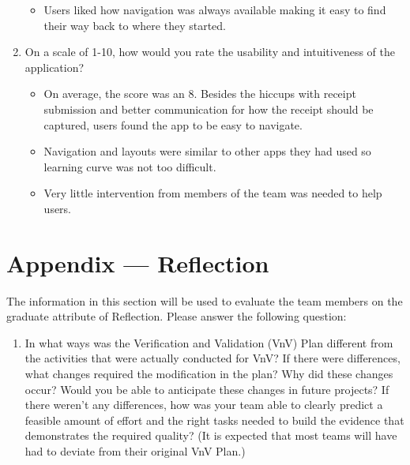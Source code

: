 \documentclass[12pt, titlepage]{article}
\begin{document}
\begin{enumerate}
\begin{itemize}
      \item Users liked how navigation was always available making it easy to find their way back to where
      they started.
    \end{itemize}
  \item On a scale of 1-10, how would you rate the usability and intuitiveness of the application?
    \begin{itemize}
      \item On average, the score was an 8. Besides the hiccups with receipt submission and better communication
      for how the receipt should be captured, users found the app to be easy to navigate.
      \item Navigation and layouts were similar to other apps they had used so learning curve was not
      too difficult.
      \item Very little intervention from members of the team was needed to help users.
    \end{itemize}
\end{enumerate}

\newpage{}
\section*{Appendix --- Reflection}

The information in this section will be used to evaluate the team members on the
graduate attribute of Reflection.  Please answer the following question:

\begin{enumerate}
  \item In what ways was the Verification and Validation (VnV) Plan different
  from the activities that were actually conducted for VnV?  If there were
  differences, what changes required the modification in the plan?  Why did
  these changes occur?  Would you be able to anticipate these changes in future
  projects?  If there weren't any differences, how was your team able to clearly
  predict a feasible amount of effort and the right tasks needed to build the
  evidence that demonstrates the required quality?  (It is expected that most
  teams will have had to deviate from their original VnV Plan.)
\end{enumerate}
\end{document}
